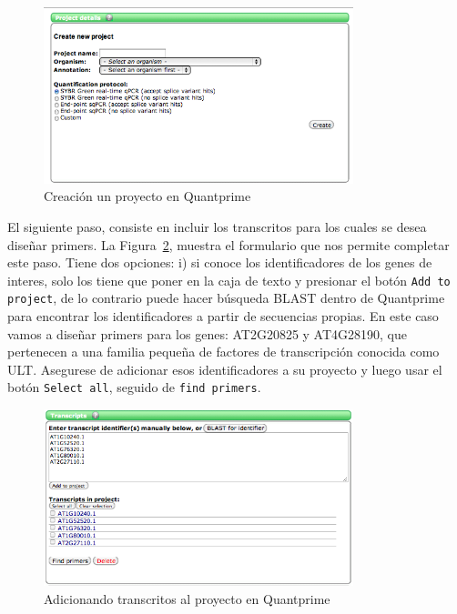 \documentclass[letter,11pt]{book}
\begin{document}
\begin{figure}[h!]
\centering
 \includegraphics[width=9cm]{Figs/QP_createproject.png}
 \caption{\label{fig:QP_createproject}Creación un proyecto en {\sc Quantprime}}
\end{figure}

El siguiente paso, consiste en  incluir los transcritos para los cuales se desea diseñar primers. La Figura~\ref{fig:QP_transcripts}, muestra el formulario que nos permite completar este paso. Tiene dos opciones: i) si conoce los identificadores de los genes de interes, solo los tiene que poner en la caja de texto y presionar el botón \Verb+Add to project+, de lo contrario puede hacer búsqueda BLAST dentro de {\sc Quantprime} para encontrar los identificadores a partir de secuencias propias. En este caso vamos a diseñar primers para los genes: AT2G20825 y AT4G28190, que pertenecen a una familia pequeña de factores de transcripción conocida como ULT. Asegurese de adicionar esos identificadores a su proyecto y luego usar el botón \Verb+Select all+, seguido de \Verb+find primers+.

\begin{figure}[h!]
\centering
 \includegraphics[width=9cm]{Figs/QP_transcripts.png}
 \caption{\label{fig:QP_transcripts}Adicionando transcritos al proyecto en  {\sc Quantprime}}
\end{figure}
\end{document}
